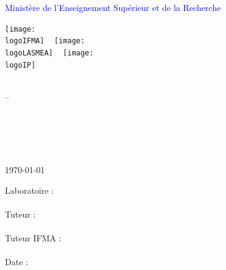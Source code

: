 
\thispagestyle{empty}
\textcolor{blue}{Ministère de l'Enseignement Supérieur et de la Recherche}\\
\vspace{5mm}
\begin{centering}

  \texttt{[image: \\logoIFMA]} ~
  \texttt{[image: \\logoLASMEA]} ~
  \texttt{[image: \\logoIP]}

\end{centering}

\vspace{5mm}
\begin{center} 
\begin{large}
\textbf{\titre}
\end{large}
\\\vspace{3mm}--\vspace{3mm}\\
\begin{Huge}
\textbf{\sujet}
\end{Huge}
\\
\vspace{10mm}
\begin{LARGE}
\auteur\\

\vspace{5mm}
\annee\\
\end{LARGE}
\vspace{5mm}
\today
\end{center}

\begin{flushright}
\begin{large}
Laboratoire :\\

\textbf{\lieu}\\

\vspace{3mm}
Tuteur :\\

\textbf{\tuteur}\\

\vspace{3mm}
Tuteur IFMA :\\

\textbf{\tuteurIFMA}\\

\vspace{3mm}
Date : \dates
\end{large}
\end{flushright}

